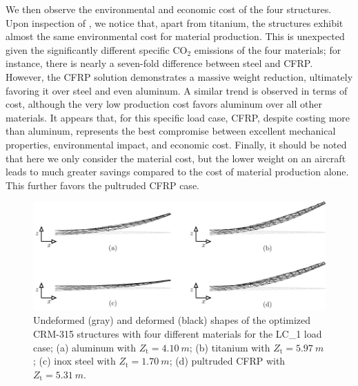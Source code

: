 We then observe the environmental and economic cost of the four structures. Upon inspection of , we notice that, apart from titanium, the structures exhibit almost the same environmental cost for material production. This is unexpected given the significantly different specific CO$_2$ emissions of the four materials; for instance, there is nearly a seven-fold difference between steel and CFRP. However, the CFRP solution demonstrates a massive weight reduction, ultimately favoring it over steel and even aluminum. A similar trend is observed in terms of cost, although the very low production cost favors aluminum over all other materials. It appears that, for this specific load case, CFRP, despite costing more than aluminum, represents the best compromise between excellent mechanical properties, environmental impact, and economic cost. Finally, it should be noted that here we only consider the material cost, but the lower weight on an aircraft leads to much greater savings compared to the cost of material production alone. This further favors the pultruded CFRP case.

\begin{figure}
    \centering
    \includegraphics[width=\linewidth]{figures/07_aeronautic/00_materials/mat.pdf}
     \caption{Undeformed (gray) and deformed (black) shapes of the optimized CRM-315 structures with four different materials for the LC\_1 load case; (a) aluminum with $Z_\text{t}=\qty{4.10}{m}$; (b) titanium with $Z_\text{t}=\qty{5.97}{m}$; (c) inox steel with $Z_\text{t}=\qty{1.70}{m}$; (d) pultruded CFRP with $Z_\text{t}=\qty{5.31}{m}$.}
    \label{fig:07_mat_sol}
\end{figure}

